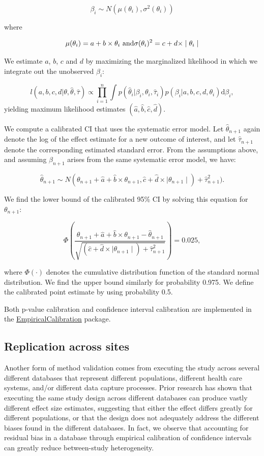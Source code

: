 \documentclass[11pt]{book}
\begin{document}
\[\beta_i \sim N(\mu(\theta_i) , \sigma^2(\theta_i))\]

where

\[\mu(\theta_i) = a + b \times \theta_i \text{ and} \\
  \sigma(\theta_i) ^2= c + d \times \mid \theta_i \mid\]

We estimate \(a\), \(b\), \(c\) and \(d\) by maximizing the marginalized
likelihood in which we integrate out the unobserved \(\beta_i\):

\[l(a,b,c,d | \theta, \hat{\theta}, \hat{\tau} ) \propto \prod_{i=1}^{n}\int p(\hat{\theta}_i|\beta_i, \theta_i, \hat{\tau}_i)p(\beta_i|a,b,c,d,\theta_i) \text{d}\beta_i ,\]
yielding maximum likelihood estimates
\((\hat{a}, \hat{b}, \hat{c}, \hat{d})\).

We compute a calibrated CI that uses the systematic error model. Let
\(\hat{\theta}_{n+1}\) again denote the log of the effect estimate for a
new outcome of interest, and let \(\hat{\tau}_{n+1}\) denote the
corresponding estimated standard error. From the assumptions above, and
assuming \(\beta_{n+1}\) arises from the same systematic error model, we
have:

\[\hat{\theta}_{n+1} \sim N(
\theta_{n+1} + \hat{a} + \hat{b} \times \theta_{n+1},
\hat{c} + \hat{d} \times \mid \theta_{n+1} \mid) + \hat{\tau}_{n+1}^2) .\]

We find the lower bound of the calibrated 95\% CI by solving this
equation for \(\theta_{n+1}\):

\[\Phi\left(
\frac{\theta_{n+1} + \hat{a} + \hat{b} \times \theta_{n+1}-\hat{\theta}_{n+1}}
{\sqrt{(\hat{c} + \hat{d} \times \mid \theta_{n+1} \mid) + \hat{\tau}_{n+1}^2}}
\right) = 0.025 ,\]

where \(\Phi(\cdot)\) denotes the cumulative distribution function of
the standard normal distribution. We find the upper bound similarly for
probability 0.975. We define the calibrated point estimate by using
probability 0.5.

Both p-value calibration and confidence interval calibration are
implemented in the
\href{https://ohdsi.github.io/EmpiricalCalibration/}{EmpiricalCalibration}
package.

\subsection{Replication across sites}\label{replication-across-sites}

Another form of method validation comes from executing the study across
several different databases that represent different populations,
different health care systems, and/or different data capture processes.
Prior research has shown that executing the same study design across
different databases can produce vastly different effect size estimates,
\citep{madigan_2013} suggesting that either the effect differs greatly
for different populations, or that the design does not adequately
address the different biases found in the different databases. In fact,
we observe that accounting for residual bias in a database through
empirical calibration of confidence intervals can greatly reduce
between-study heterogeneity. \citep{schuemie_2018}
\end{document}
